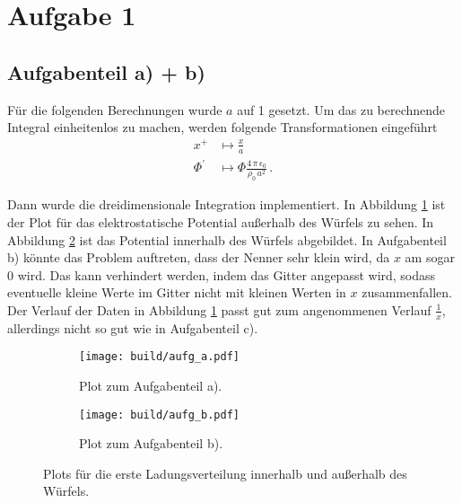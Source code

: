 \section*{Aufgabe 1}
\subsection*{Aufgabenteil a) + b)}
Für die folgenden Berechnungen wurde $a$ auf 1 gesetzt.
Um das zu berechnende Integral einheitenlos zu machen, werden folgende Transformationen
eingeführt
\begin{align*}
  x^+ &\mapsto \frac{x}{a} \\
  \Phi^{'} &\mapsto \Phi  \frac{4\, \pi \, \epsilon_0}{\rho_0 \, a^2} \, .
\end{align*}

Dann wurde die dreidimensionale Integration implementiert. In Abbildung
\ref{subfig:a} ist der Plot für das elektrostatische Potential außerhalb des
Würfels zu sehen. In Abbildung \ref{subfig:b} ist das Potential innerhalb des
Würfels abgebildet. In Aufgabenteil b) könnte das Problem auftreten, dass der
Nenner sehr klein wird, da $x$ am sogar 0 wird. Das kann verhindert werden,
indem das Gitter angepasst wird, sodass eventuelle kleine Werte im Gitter nicht
mit kleinen Werten in $x$ zusammenfallen. Der Verlauf der Daten in Abbildung
\ref{subfig:a} passt gut zum angenommenen Verlauf $\frac{1}{x}$, allerdings
nicht so gut wie in Aufgabenteil c).

\begin{figure}
  \centering
  \begin{subfigure}{0.49\textwidth}
    \centering
    \texttt{[image: build/aufg\_a.pdf]}
    \caption{Plot zum Aufgabenteil a).}
    \label{subfig:a}
  \end{subfigure}
  \begin{subfigure}{0.49\textwidth}
    \centering
    \texttt{[image: build/aufg\_b.pdf]}
    \caption{Plot zum Aufgabenteil b).}
    \label{subfig:b}
  \end{subfigure}
  \caption{Plots für die erste Ladungsverteilung innerhalb und außerhalb
  des Würfels.}
  \label{fig:1}
\end{figure}

